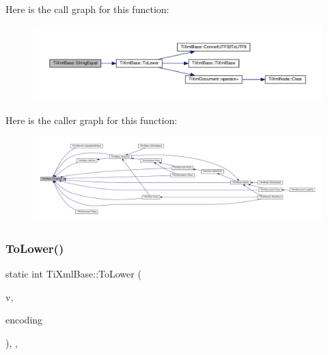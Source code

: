 Here is the call graph for this function\+:\nopagebreak
\begin{figure}[H]
\begin{center}
\leavevmode
\includegraphics[width=350pt]{class_ti_xml_base_a51631e6986179558b9e5850723ed165a_cgraph}
\end{center}
\end{figure}
Here is the caller graph for this function\+:\nopagebreak
\begin{figure}[H]
\begin{center}
\leavevmode
\includegraphics[width=350pt]{class_ti_xml_base_a51631e6986179558b9e5850723ed165a_icgraph}
\end{center}
\end{figure}
\mbox{\label{class_ti_xml_base_a799f17405a86a5c2029618e85f11a097}} 
\subsubsection{\texorpdfstring{To\+Lower()}{ToLower()}}
{\footnotesize\ttfamily static int Ti\+Xml\+Base\+::\+To\+Lower (\begin{DoxyParamCaption}\item[{int}]{v,  }\item[{\hyperlink{tinyxml_8h_a88d51847a13ee0f4b4d320d03d2c4d96}{Ti\+Xml\+Encoding}}]{encoding }\end{DoxyParamCaption})\hspace{0.3cm}{\ttfamily [inline]}, {\ttfamily [static]}, {\ttfamily [protected]}}

